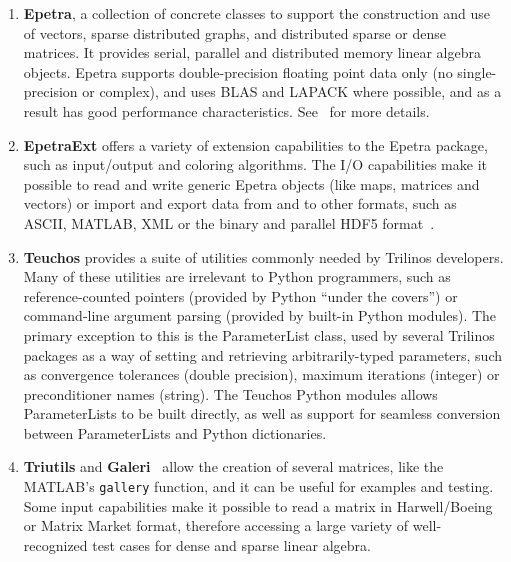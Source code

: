 \documentclass[acmtocl]{acmtrans2m}
\begin{document}
\begin{enumerate}

\item {\bf Epetra}, a collection of concrete classes to support the
  construction and use of vectors, sparse distributed graphs, and
  distributed sparse or dense matrices.  It provides serial, parallel
  and distributed memory linear algebra objects.  Epetra supports
  double-precision floating point data only (no single-precision or
  complex), and uses BLAS and LAPACK where possible, and as a result
  has good performance characteristics.  See~\cite{epetra-guide} for
  more details.

\item {\bf EpetraExt} offers a variety of extension capabilities to
  the Epetra package, such as input/output and coloring algorithms.
  The I/O capabilities make it possible to read and write generic
  Epetra objects (like maps, matrices and vectors) or import and
  export data from and to other formats, such as ASCII, MATLAB, XML or
  the binary and parallel HDF5 format~\cite{epetraext_io,hdf5-sc}.

\item {\bf Teuchos} provides a suite of utilities commonly needed by
  Trilinos developers.  Many of these utilities are irrelevant to
  Python programmers, such as reference-counted pointers (provided by
  Python ``under the covers'') or command-line argument parsing
  (provided by built-in Python modules).  The primary exception to
  this is the ParameterList class, used by several Trilinos packages
  as a way of setting and retrieving arbitrarily-typed parameters,
  such as convergence tolerances (double precision), maximum
  iterations (integer) or preconditioner names (string).  The Teuchos
  Python modules allows ParameterLists to be built directly, as well
  as support for seamless conversion between ParameterLists and Python
  dictionaries.

\item {\bf Triutils} and {\bf Galeri}~\cite{Galeri-home-page}
  allow the creation of several matrices, like the
  MATLAB's {\tt gallery} function, and it can be useful for examples
  and testing.  Some input capabilities make it possible to read a
  matrix in Harwell/Boeing or Matrix Market format, therefore
  accessing a large variety of well-recognized test cases for dense
  and sparse linear algebra.


\end{enumerate}
\end{document}
